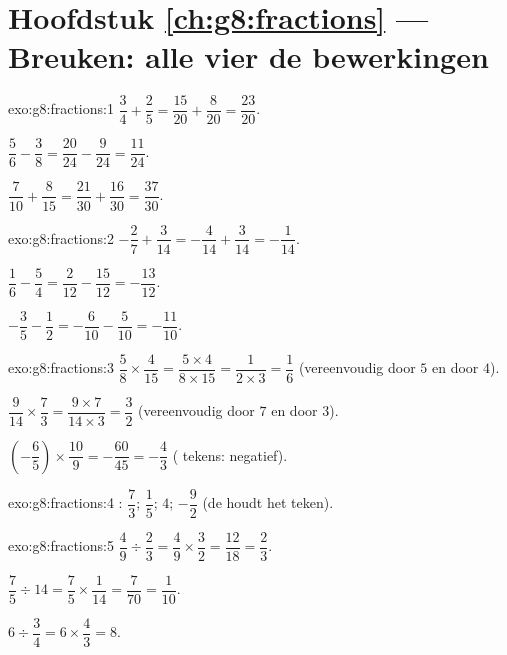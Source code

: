 \section*{Hoofdstuk \ref{ch:g8:fractions} --- Breuken: alle vier de bewerkingen}

\begin{solution}{exo:g8:fractions:1}
$\dfrac34 + \dfrac25 = \dfrac{15}{20} + \dfrac{8}{20} = \dfrac{23}{20}$.

$\dfrac56 - \dfrac38 = \dfrac{20}{24} - \dfrac{9}{24} = \dfrac{11}{24}$.

$\dfrac{7}{10} + \dfrac{8}{15} = \dfrac{21}{30} + \dfrac{16}{30} = \dfrac{37}{30}$.
\end{solution}

\begin{solution}{exo:g8:fractions:2}
$-\dfrac27 + \dfrac{3}{14} = -\dfrac{4}{14} + \dfrac{3}{14} = -\dfrac{1}{14}$.

$\dfrac16 - \dfrac54 = \dfrac{2}{12} - \dfrac{15}{12} = -\dfrac{13}{12}$.

$-\dfrac35 - \dfrac12 = -\dfrac{6}{10} - \dfrac{5}{10} = -\dfrac{11}{10}$.
\end{solution}

\begin{solution}{exo:g8:fractions:3}
$\dfrac58 \times \dfrac{4}{15} = \dfrac{5 \times 4}{8 \times 15} =
\dfrac{1}{2 \times 3} = \dfrac16$ (vereenvoudig door $5$ en door $4$).

$\dfrac{9}{14} \times \dfrac73 = \dfrac{9 \times 7}{14 \times 3} = \dfrac{3}{2}$
(vereenvoudig door $7$ en door $3$).

$\left(-\dfrac65\right) \times \dfrac{10}{9} = -\dfrac{60}{45} = -\dfrac43$
( tekens: negatief).
\end{solution}

\begin{solution}{exo:g8:fractions:4}
: $\dfrac73$; \quad $\dfrac15$; \quad $4$; \quad $-\dfrac92$ (de
 houdt het teken).
\end{solution}

\begin{solution}{exo:g8:fractions:5}
$\dfrac49 \div \dfrac23 = \dfrac49 \times \dfrac32 = \dfrac{12}{18} = \dfrac23$.

$\dfrac75 \div 14 = \dfrac75 \times \dfrac{1}{14} = \dfrac{7}{70} = \dfrac{1}{10}$.

$6 \div \dfrac34 = 6 \times \dfrac43 = 8$.
\end{solution}


